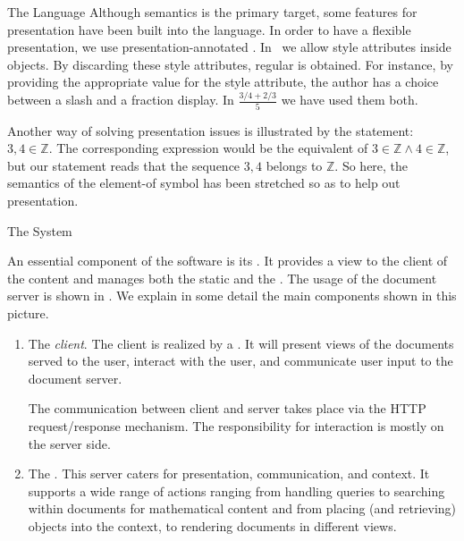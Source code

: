 \begin{omgroup}[id=mathdox2,short=MathDox,creators={amc,cuypers,barreiro}]
\begin{omgroup}[id=mathdox.ui]{The Language}
Although semantics is the primary target, some features for presentation have been built
into the language.  In order to have a flexible presentation, we use
presentation-annotated {\openmath}.  In \MathDox\ we allow style attributes inside
{\openmath} objects.  By discarding these style attributes, regular {\openmath} is
obtained. For instance, by providing the appropriate value for the style attribute, the
author has a choice between a slash and a fraction display. In $\frac{3/4+2/3}{5}$ we have
used them both.

Another way of solving presentation issues is illustrated by the statement:
$3,4\in\mathbb{Z}$.  The corresponding {\openmath} expression would be the equivalent of
$3\in\mathbb{Z} \wedge 4\in\mathbb{Z}$, but our {\openmath} statement reads that the
sequence $3,4$ belongs to $\mathbb{Z}$.  So here, the semantics of the element-of symbol
has been stretched so as to help out presentation.
\end{omgroup}

\begin{omgroup}[id=mathdox.cont_theory]{The {\MathDox} System}

An essential component of the {\MathDox} software is its {}. It
provides a view to the client of the content and manages both the
static and the {}.  The usage of the
{\MathDox} document server is shown in {}. We explain in some detail
the main components shown in this picture.


\begin{myfig}{DocModel}{The {\MathDox} software}
  \texttt{[image: \\projectsPath\{mathdox/DocModel]}}
\end{myfig}

\begin{enumerate}
\item The {\emph{client}}. The client is realized by a
  {}.  It will present views of the documents served
  to the user, interact with the user, and communicate user input to the document server.

  The communication between client and server takes place via the HTTP request/response
  mechanism.  The responsibility for interaction is mostly on the server side.
\item The {\emph{}}.  This server caters for presentation,
  communication, and context.  It supports a wide range of actions ranging from handling
  queries to searching within documents for mathematical content and from placing (and
  retrieving) objects into the context, to rendering documents in different views.


\end{enumerate}
\end{omgroup}
\end{omgroup}
